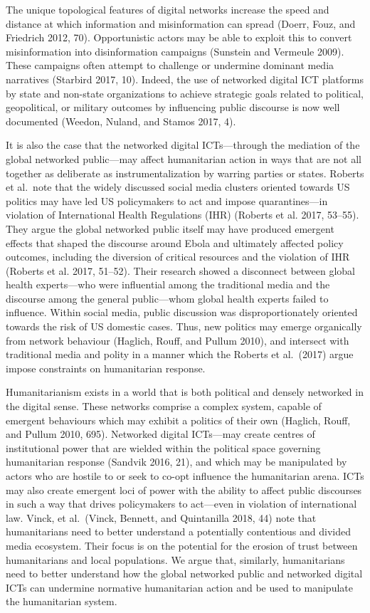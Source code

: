 \documentclass[
]{article}
\begin{document}
The unique topological features of digital networks increase the speed
and distance at which information and misinformation can spread (Doerr,
Fouz, and Friedrich 2012, 70). Opportunistic actors may be able to
exploit this to convert misinformation into disinformation campaigns
(Sunstein and Vermeule 2009). These campaigns often attempt to challenge
or undermine dominant media narratives (Starbird 2017, 10). Indeed, the
use of networked digital ICT platforms by state and non-state
organizations to achieve strategic goals related to political,
geopolitical, or military outcomes by influencing public discourse is
now well documented (Weedon, Nuland, and Stamos 2017, 4).

It is also the case that the networked digital ICTs---through the
mediation of the global networked public---may affect humanitarian
action in ways that are not all together as deliberate as
instrumentalization by warring parties or states. Roberts et al.~note
that the widely discussed social media clusters oriented towards US
politics may have led US policymakers to act and impose quarantines---in
violation of International Health Regulations (IHR) (Roberts et al.
2017, 53--55). They argue the global networked public itself may have
produced emergent effects that shaped the discourse around Ebola and
ultimately affected policy outcomes, including the diversion of critical
resources and the violation of IHR (Roberts et al. 2017, 51--52). Their
research showed a disconnect between global health experts---who were
influential among the traditional media and the discourse among the
general public---whom global health experts failed to influence. Within
social media, public discussion was disproportionately oriented towards
the risk of US domestic cases. Thus, new politics may emerge organically
from network behaviour (Haglich, Rouff, and Pullum 2010), and intersect
with traditional media and polity in a manner which the Roberts et
al.~(2017) argue impose constraints on humanitarian response.

Humanitarianism exists in a world that is both political and densely
networked in the digital sense. These networks comprise a complex
system, capable of emergent behaviours which may exhibit a politics of
their own (Haglich, Rouff, and Pullum 2010, 695). Networked digital
ICTs---may create centres of institutional power that are wielded within
the political space governing humanitarian response (Sandvik 2016, 21),
and which may be manipulated by actors who are hostile to or seek to
co-opt influence the humanitarian arena. ICTs may also create emergent
loci of power with the ability to affect public discourses in such a way
that drives policymakers to act---even in violation of international
law. Vinck, et al.~(Vinck, Bennett, and Quintanilla 2018, 44) note that
humanitarians need to better understand a potentially contentious and
divided media ecosystem. Their focus is on the potential for the erosion
of trust between humanitarians and local populations. We argue that,
similarly, humanitarians need to better understand how the global
networked public and networked digital ICTs can undermine normative
humanitarian action and be used to manipulate the humanitarian system.
\end{document}
